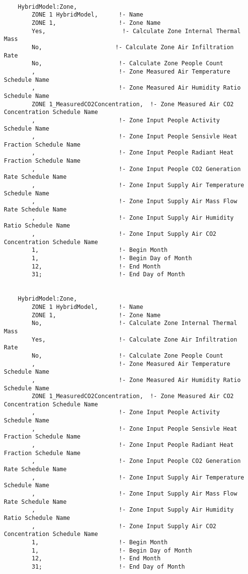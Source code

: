 \begin{lstlisting}
    
    HybridModel:Zone,
        ZONE 1 HybridModel,      !- Name
        ZONE 1,                  !- Zone Name
        Yes,                      !- Calculate Zone Internal Thermal Mass
        No,                     !- Calculate Zone Air Infiltration Rate
        No,                      !- Calculate Zone People Count
        ,                        !- Zone Measured Air Temperature Schedule Name
        ,                        !- Zone Measured Air Humidity Ratio Schedule Name
        ZONE 1_MeasuredCO2Concentration,  !- Zone Measured Air CO2 Concentration Schedule Name
        ,                        !- Zone Input People Activity Schedule Name
        ,                        !- Zone Input People Sensivle Heat Fraction Schedule Name
        ,                        !- Zone Input People Radiant Heat Fraction Schedule Name
        ,                        !- Zone Input People CO2 Generation Rate Schedule Name
        ,                        !- Zone Input Supply Air Temperature Schedule Name
        ,                        !- Zone Input Supply Air Mass Flow Rate Schedule Name
        ,                        !- Zone Input Supply Air Humidity Ratio Schedule Name
        ,                        !- Zone Input Supply Air CO2 Concentration Schedule Name
        1,                       !- Begin Month
        1,                       !- Begin Day of Month
        12,                      !- End Month
        31;                      !- End Day of Month


    HybridModel:Zone,
        ZONE 1 HybridModel,      !- Name
        ZONE 1,                  !- Zone Name
        No,                      !- Calculate Zone Internal Thermal Mass
        Yes,                     !- Calculate Zone Air Infiltration Rate
        No,                      !- Calculate Zone People Count
        ,                        !- Zone Measured Air Temperature Schedule Name
        ,                        !- Zone Measured Air Humidity Ratio Schedule Name
        ZONE 1_MeasuredCO2Concentration,  !- Zone Measured Air CO2 Concentration Schedule Name
        ,                        !- Zone Input People Activity Schedule Name
        ,                        !- Zone Input People Sensivle Heat Fraction Schedule Name
        ,                        !- Zone Input People Radiant Heat Fraction Schedule Name
        ,                        !- Zone Input People CO2 Generation Rate Schedule Name
        ,                        !- Zone Input Supply Air Temperature Schedule Name
        ,                        !- Zone Input Supply Air Mass Flow Rate Schedule Name
        ,                        !- Zone Input Supply Air Humidity Ratio Schedule Name
        ,                        !- Zone Input Supply Air CO2 Concentration Schedule Name
        1,                       !- Begin Month
        1,                       !- Begin Day of Month
        12,                      !- End Month
        31;                      !- End Day of Month



\end{lstlisting}
